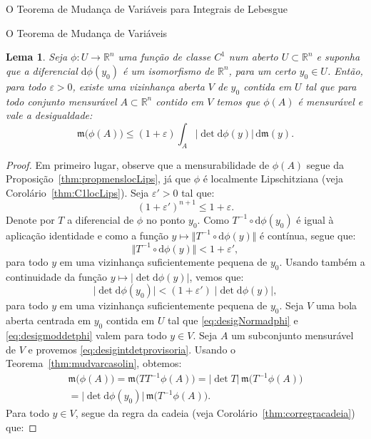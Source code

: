 \documentclass[oneside,final,11pt]{amsbook}
\newcommand{\R}{\mathds R}
\newcommand{\leb}{\mathfrak m}
\newcommand{\dd}{\mathrm d}
\theoremstyle{remark}\newtheorem{exercise}{Exercício}[chapter]
\theoremstyle{remark}\newtheorem{*exercise}[exercise]{\hbox to 0pt{\hskip 0pt minus 1fil*}Exercício}
\theoremstyle{definition}\newtheorem{exdefin}{Definição}[chapter]
\theoremstyle{plain}\newtheorem{teo}{Teorema}[section]
\theoremstyle{plain}\newtheorem{lem}[teo]{Lema}
\theoremstyle{plain}\newtheorem{prop}[teo]{Proposição}
\theoremstyle{plain}\newtheorem{cor}[teo]{Corolário}
\theoremstyle{definition}\newtheorem{defin}[teo]{Definição}
\theoremstyle{remark}\newtheorem{rem}[teo]{Observação}
\theoremstyle{definition}\newtheorem{notation}[teo]{Notação}
\theoremstyle{definition}\newtheorem{convention}[teo]{Convenção}
\theoremstyle{definition}\newtheorem{example}[teo]{Exemplo}
\numberwithin{section}{chapter}
\numberwithin{equation}{section}
\begin{document}
\begin{chapter}{O Teorema de Mudança de Variáveis para Integrais de Lebesgue}
\begin{section}{O Teorema de Mudança de Variáveis}
\begin{lem}\label{thm:lemaphiquaselin}
Seja $\phi:U\to\R^n$ uma função de classe $C^1$ num aberto $U\subset\R^n$ e suponha que a diferencial
$\dd\phi(y_0)$ é um isomorfismo de $\R^n$, para um certo $y_0\in U$. Então, para todo $\varepsilon>0$,
existe uma vizinhança aberta $V$ de $y_0$ contida em $U$ tal que para todo conjunto mensurável $A\subset\R^n$
contido em $V$ temos que $\phi(A)$ é mensurável e vale a desigualdade:
\begin{equation}\label{eq:desigintdetprovisoria}
\leb\big(\phi(A)\big)\le(1+\varepsilon)\int_A\big\vert\det\dd\phi(y)\big\vert\,\dd\leb(y).
\end{equation}
\end{lem}
\begin{proof}
Em primeiro lugar, observe que a mensurabilidade de $\phi(A)$ segue da Proposição~\ref{thm:propmenslocLips},
já que $\phi$ é localmente Lipschitziana (veja Corolário~\ref{thm:C1locLips}).
Seja $\varepsilon'>0$ tal que:
\[(1+\varepsilon')^{n+1}\le1+\varepsilon.\]
Denote por $T$ a diferencial de $\phi$ no ponto $y_0$. Como $T^{-1}\circ\dd\phi(y_0)$ é igual à aplicação identidade
e como a função $y\mapsto\Vert T^{-1}\circ\dd\phi(y)\Vert$ é contínua, segue que:
\begin{equation}\label{eq:desigNormadphi}
\big\Vert T^{-1}\circ\dd\phi(y)\big\Vert<1+\varepsilon',
\end{equation}
para todo $y$ em uma vizinhança suficientemente pequena de $y_0$. Usando também a continuidade da função
$y\mapsto\big\vert\det\dd\phi(y)\big\vert$, vemos que:
\begin{equation}\label{eq:desigmoddetphi}
\big\vert\det\dd\phi(y_0)\big\vert<(1+\varepsilon')\;\big\vert\det\dd\phi(y)\big\vert,
\end{equation}
para todo $y$ em uma vizinhança suficientemente pequena de $y_0$. Seja $V$ uma bola aberta centrada em $y_0$ contida
em $U$ tal que \eqref{eq:desigNormadphi} e \eqref{eq:desigmoddetphi} valem para todo $y\in V$.
Seja $A$ um subconjunto mensurável de $V$ e provemos
\eqref{eq:desigintdetprovisoria}. Usando o Teorema~\ref{thm:mudvarcasolin}, obtemos:
\begin{multline}\label{eq:desigphiA1}
\leb\big(\phi(A)\big)=\leb\big(TT^{-1}\phi(A)\big)=\vert\det T\vert\,\leb\big(T^{-1}\phi(A)\big)\\
=\big\vert\det\dd\phi(y_0)\big\vert\,\leb\big(T^{-1}\phi(A)\big).
\end{multline}
Para todo $y\in V$, segue da regra da cadeia (veja Corolário~\ref{thm:corregracadeia}) que:

\end{proof}
\end{section}
\end{chapter}
\end{document}
